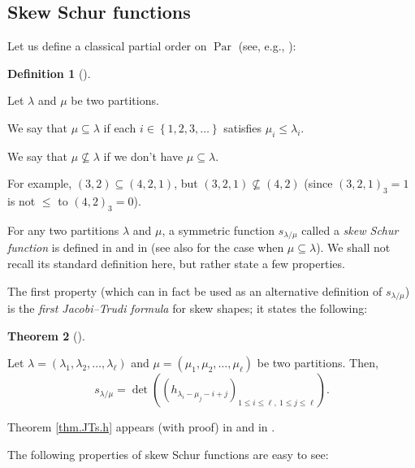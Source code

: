 \documentclass[numbers=enddot,12pt,final,onecolumn,notitlepage]{scrartcl}%
\theoremstyle{definition}
\newtheorem{theo}{Theorem}[section]
\newenvironment{theorem}[1][]
{\begin{theo}[#1]\begin{leftbar}}
{\end{leftbar}\end{theo}}
\newtheorem{defi}[theo]{Definition}
\newenvironment{definition}[1][]
{\begin{defi}[#1]\begin{leftbar}}
{\end{leftbar}\end{defi}}
\begin{document}
\subsection{\label{subsect.proofs.skew}Skew Schur functions}

Let us define a classical partial order on $\operatorname*{Par}$ (see, e.g.,
\cite[Definition 2.3.1]{GriRei}):

\begin{definition}
Let $\lambda$ and $\mu$ be two partitions.

We say that $\mu\subseteq\lambda$ if each $i\in\left\{  1,2,3,\ldots\right\}
$ satisfies $\mu_{i}\leq\lambda_{i}$.

We say that $\mu\not \subseteq \lambda$ if we don't have $\mu\subseteq\lambda$.
\end{definition}

For example, $\left(  3,2\right)  \subseteq\left(  4,2,1\right)  $, but
$\left(  3,2,1\right)  \not \subseteq \left(  4,2\right)  $ (since $\left(
3,2,1\right)  _{3}=1$ is not $\leq$ to $\left(  4,2\right)  _{3}=0$).

For any two partitions $\lambda$ and $\mu$, a symmetric function
$s_{\lambda/\mu}$ called a \textit{skew Schur function} is defined in
\cite[Definition 2.3.1]{GriRei} and in \cite[\S I.5]{Macdon95} (see also
\cite[Definition 7.10.1]{Stanley-EC2} for the case when $\mu\subseteq\lambda
$). We shall not recall its standard definition here, but rather state a few properties.

The first property (which can in fact be used as an alternative definition of
$s_{\lambda/\mu}$) is the \textit{first Jacobi--Trudi formula} for skew
shapes; it states the following:

\begin{theorem}
\label{thm.JTs.h}Let $\lambda=\left(  \lambda_{1},\lambda_{2},\ldots
,\lambda_{\ell}\right)  $ and $\mu=\left(  \mu_{1},\mu_{2},\ldots,\mu_{\ell
}\right)  $ be two partitions. Then,%
\begin{equation}
s_{\lambda/\mu}=\det\left(  \left(  h_{\lambda_{i}-\mu_{j}-i+j}\right)
_{1\leq i\leq\ell,\ 1\leq j\leq\ell}\right)  . \label{eq.schur.JT.sh-lammu}%
\end{equation}

\end{theorem}

Theorem \ref{thm.JTs.h} appears (with proof) in \cite[(2.4.16)]{GriRei} and in
\cite[Chapter I, (5.4)]{Macdon95}.

The following properties of skew Schur functions are easy to see:
\end{document}
